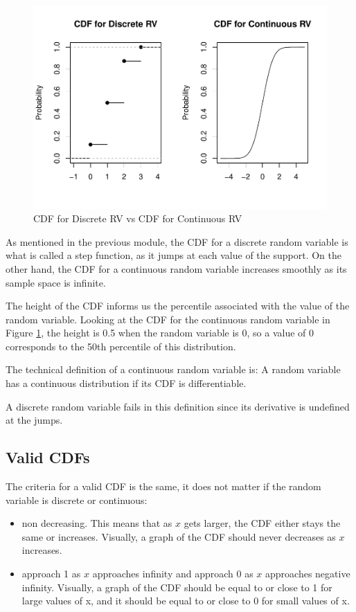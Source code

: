 \documentclass[
]{book}
\providecommand{\tightlist}{%
  \setlength{\itemsep}{0pt}\setlength{\parskip}{0pt}}
\begin{document}
\begin{figure}
\centering
\includegraphics{bookdown-demo_files/figure-latex/4-compare-1.pdf}
\caption{\label{fig:4-compare}CDF for Discrete RV vs CDF for Continuous RV}
\end{figure}

As mentioned in the previous module, the CDF for a discrete random variable is what is called a step function, as it jumps at each value of the support. On the other hand, the CDF for a continuous random variable increases smoothly as its sample space is infinite.

The height of the CDF informs us the percentile associated with the value of the random variable. Looking at the CDF for the continuous random variable in Figure \ref{fig:4-compare}, the height is 0.5 when the random variable is 0, so a value of 0 corresponds to the 50th percentile of this distribution.

The technical definition of a continuous random variable is: A random variable has a continuous distribution if its CDF is differentiable.

A discrete random variable fails in this definition since its derivative is undefined at the jumps.

\subsection{Valid CDFs}\label{valid-cdfs-1}

The criteria for a valid CDF is the same, it does not matter if the random variable is discrete or continuous:

\begin{itemize}
\tightlist
\item
  non decreasing. This means that as \(x\) gets larger, the CDF either stays the same or increases. Visually, a graph of the CDF should never decreases as \(x\) increases.
\item
  approach 1 as \(x\) approaches infinity and approach 0 as \(x\) approaches negative infinity. Visually, a graph of the CDF should be equal to or close to 1 for large values of x, and it should be equal to or close to 0 for small values of x.
\end{itemize}
\end{document}
